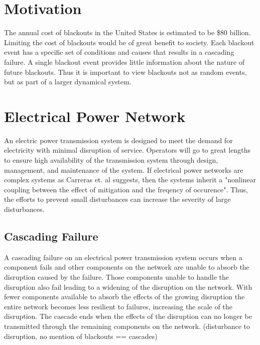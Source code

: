 \chapter{Motivation}
The annual cost of blackouts in the United States is estimated to be \$80 billion.\cite{lacommare2004understanding} Limiting the cost of blackouts would be of great benefit to society. Each blackout event has a specific set of conditions and causes that results in a cascading failure. A single blackout event provides little information about the nature of future blackouts. Thus it is important to view blackouts not as random events, but as part of a larger dynamical system.\cite{carreras2004complex} 

\chapter{Electrical Power Network}
An electric power transmission system is designed to meet the demand for electricity with minimal disruption of service. Operators will go to great lengths to ensure high availability of the transmission system through design, management, and maintenance of the system.\cite{carreras2001evidence} If electrical power networks are complex systems as Carreras et. al suggests, then the systems inherit a "nonlinear coupling between the effect of mitigation and the freqency of occurence". Thus, the efforts to prevent small disturbances can increase the severity of large disturbances.\cite{newman2011exploring}

\section{Cascading Failure}
A cascading failure on an electrical power transmission system occurs when a component fails and other components on the network are unable to absorb the disruption caused by the failure. Those components unable to handle the disruption also fail leading to a widening of the disruption on the network. With fewer components available to absorb the effects of the growing disruption the entire network becomes less resilient to failures, increasing the scale of the disruption. The cascade ends when the effects of the disruption can no longer be transmitted through the remaining components on the network. (disturbance to disruption, no mention of blackouts == cascades)


